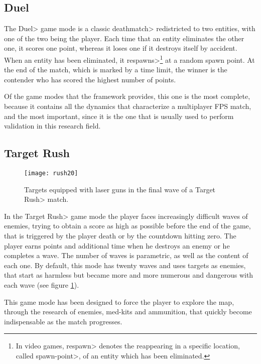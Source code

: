 \subsection{Duel}

The \<Duel> game mode is a classic \<deathmatch> redistricted to two entities, with one of the two being the player. Each time that an entity eliminates the other one, it scores one point, whereas it loses one if it destroys itself by accident. When an entity has been eliminated, it \<respawns>\footnote{In video games, \<respawn> denotes the reappearing in a specific location, called \<spawn-point>, of an entity which has been eliminated.} at a random spawn point. At the end of the match, which is marked by a time limit, the winner is the contender who has scored the highest number of points.

\par

Of the game modes that the framework provides, this one is the most complete, because it contains all the dynamics that characterize a multiplayer FPS match, and the most important, since it is the one that is usually used to perform validation in this research field.

\subsection{Target Rush}

\begin{figure}
\centering
\texttt{[image: rush20]}
\caption{Targets equipped with laser guns in the final wave of a \<Target Rush> match.}
\label{fig:targets}
\end{figure}

In the \<Target Rush> game mode the player faces increasingly difficult waves of enemies, trying to obtain a score as high as possible before the end of the game, that is triggered by the player death or by the countdown hitting zero. The player earns points and additional time when he destroys an enemy or he completes a wave. The number of waves is parametric, as well as the content of each one. By default, this mode has twenty waves and uses targets as enemies, that start as harmless but became more and more numerous and dangerous with each wave (see figure \ref{fig:targets}). 

\par

This game mode has been designed to force the player to explore the map, through the research of enemies, med-kits and ammunition, that quickly become indispensable as the match progresses.

